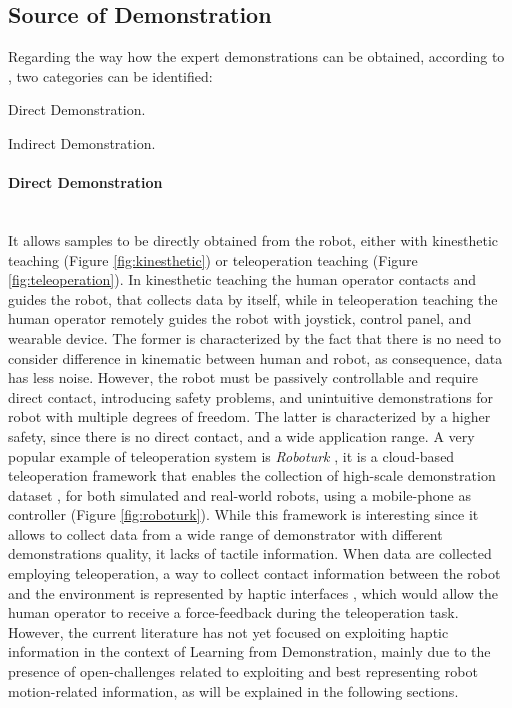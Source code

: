 \subsection{Source of Demonstration}
\label{sec:source_of_demonstration}
Regarding the way how the expert demonstrations can be obtained, according to \cite{fang2019survey}, two categories can be identified: \begin{enumerate*}[label=\textbf{(\alph*)}]
    \item Direct Demonstration. 
    \item Indirect Demonstration.
\end{enumerate*}

\paragraph{Direct Demonstration}  \mbox{} \\
\noindent It allows samples to be directly obtained from the robot, either with kinesthetic teaching (Figure \ref{fig:kinesthetic}) or teleoperation teaching (Figure \ref{fig:teleoperation}). In kinesthetic teaching the human operator contacts and guides the robot, that collects data by itself, while in teleoperation teaching the human operator remotely guides the robot with joystick, control panel, and wearable device. 
The former is characterized by the fact that there is no need to consider difference in kinematic between human and robot, as consequence, data has less noise. However, the robot must be passively controllable and require direct contact, introducing safety problems, and unintuitive demonstrations for robot with multiple degrees of freedom.
The latter is characterized by a higher safety, since there is no direct contact, and a wide application range.
A very popular example of teleoperation system is \textit{Roboturk} \cite{mandlekar2018roboturk}, it is a cloud-based teleoperation framework that enables the collection of high-scale demonstration dataset \cite{mandlekar2019scaling,mandlekar2022matters}, for both simulated and real-world robots, using a mobile-phone as controller (Figure \ref{fig:roboturk}). While this framework is interesting since it allows to collect data from a wide range of demonstrator with different demonstrations quality, it lacks of tactile information. When data are collected employing teleoperation, a way to collect contact information between the robot and the environment is represented by haptic interfaces \cite{cyberglove,touch}, which would allow the human operator to receive a force-feedback during the teleoperation task. However, the current literature has not yet focused on exploiting haptic information in the context of Learning from Demonstration, mainly due to the presence of open-challenges related to exploiting and best representing robot motion-related information, as will be explained in the following sections.

